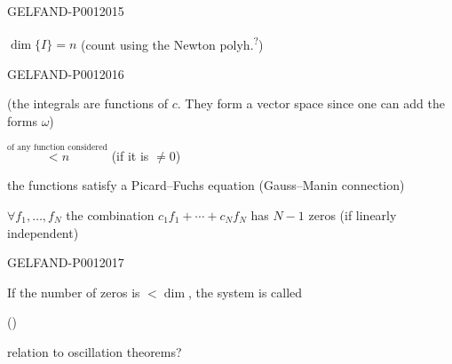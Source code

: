 \begin{GelfandAdjacentEvidence}{GELFAND-P001201}{5}


$\dim\{I\}=n$ (count using the Newton polyh.\textsuperscript{?})
\end{GelfandAdjacentEvidence}
\begin{GelfandAdjacentEvidence}{GELFAND-P001201}{6}


(the integrals are functions of $c$. They form a vector space since one can add the forms $\omega$)

  
$\overset{\text{of any function considered}}{<n}$ (if it is $\ne0$)

the functions satisfy a Picard--Fuchs equation (Gauss--Manin connection)

 $\forall f_1,\ldots,f_N$ the combination
$c_1f_1+\cdots+c_Nf_N$ has $N-1$ zeros
(if linearly independent)
\end{GelfandAdjacentEvidence}
\begin{GelfandAdjacentEvidence}{GELFAND-P001201}{7}


If the number of zeros is $<\dim$, the system is called 

()

 relation to oscillation theorems?
\end{GelfandAdjacentEvidence}
